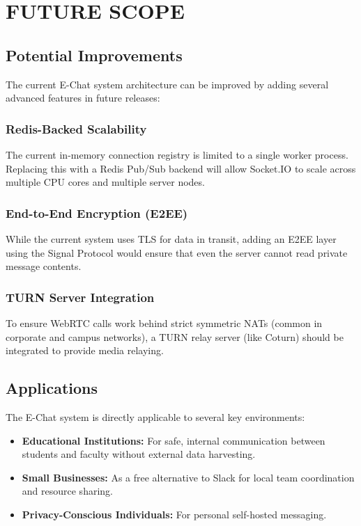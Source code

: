 \documentclass[12pt,a4paper,oneside]{report}
\begin{document}
\chapter{FUTURE SCOPE}
\label{chap:future-scope}
\thispagestyle{plain}

\section{Potential Improvements}
\label{sec:potential-improvements}

The current E-Chat system architecture can be improved by adding several advanced
features in future releases:

\subsection{Redis-Backed Scalability}
\label{subsec:redis-scalability}
The current in-memory connection registry is limited to a
single worker process. Replacing this with a Redis Pub/Sub backend will allow
Socket.IO to scale across multiple CPU cores and multiple server nodes.

\subsection{End-to-End Encryption (E2EE)}
\label{subsec:e2ee}
While the current system uses TLS for data in transit, adding an E2EE layer using
the Signal Protocol would ensure that even the server cannot read private message
contents.

\subsection{TURN Server Integration}
\label{subsec:turn-server}
To ensure WebRTC calls work behind strict symmetric NATs (common in corporate and
campus networks), a TURN relay server (like Coturn) should be integrated to
provide media relaying.

\section{Applications}
\label{sec:applications}

The E-Chat system is directly applicable to several key environments:
\begin{itemize}
    \item \textbf{Educational Institutions:} For safe, internal communication between
          students and faculty without external data harvesting.
    \item \textbf{Small Businesses:} As a free alternative to Slack for local team
          coordination and resource sharing.
    \item \textbf{Privacy-Conscious Individuals:} For personal self-hosted messaging.
\end{itemize}
\end{document}
